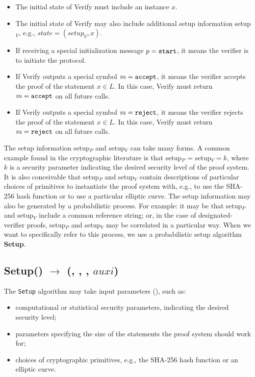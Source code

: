 \begin{itemize}
\item The initial state of Verify must include an instance $x$.
\item The initial state of Verify may also include additional setup information setup$_V$, e.g., $state = (setup_V,x)$.
\item If receiving a special initialization message $p = \tt start$, it means the verifier is to initiate the protocol.
\item If Verify outputs a special symbol $m = \tt accept$, it means the verifier accepts the proof of the statement $x \in L$. 
	In this case, Verify must return $m = \tt accept$ on all future calls.
\item If Verify outputs a special symbol $m = \tt reject$, it means the verifier rejects the proof of the statement $x \in L$. 
	In this case, Verify must return $m = \tt reject$ on all future calls.
\end{itemize}
 
The setup information setup$_P$ and setup$_V$ can take many forms. 
A common example found in the cryptographic literature is that setup$_P$ = setup$_V = k$, where $k$ is a security parameter indicating the desired security level of the proof system. 
It is also conceivable that setup$_P$ and setup$_V$ contain descriptions of particular choices of primitives to instantiate the proof system with, e.g., to use the SHA-256 hash function or to use a particular elliptic curve. 
The setup information may also be generated by a probabilistic process.
For example: it may be that setup$_P$ and setup$_V$ include a common reference string; or, in the case of designated-verifier proofs, setup$_P$ and setup$_V$ may be correlated in a particular way. 
When we want to specifically refer to this process, we use a probabilistic setup algorithm \textbf{Setup}.


\subsection[Setup]{\textbf{Setup}(\params) $\rightarrow$ (\setR, \setP, \setV, $auxi$)}
\label{security:syntax:setup}

The {\tt Setup} algorithm may take input parameters (\params), such as:

\begin{itemize} 
\item computational or statistical security parameters, indicating the desired security level;
\item parameters specifying the size of the statements the proof system should work for;
\item choices of cryptographic primitives, e.g., the SHA-256 hash function or an elliptic curve.
\end{itemize}


